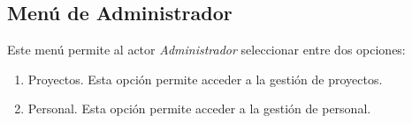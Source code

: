 \subsection{Menú de Administrador}
	Este menú permite al actor {\it Administrador} seleccionar entre dos opciones:
	\begin{enumerate}
		\item Proyectos. Esta opción permite acceder a la gestión de proyectos.
		\item Personal. Esta opción permite acceder a la gestión de personal.
	\end{enumerate}
	
	
